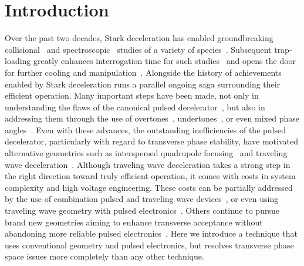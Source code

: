 \documentclass[%
 reprint,
 amsmath,amssymb,
 aps,
prl,
]{revtex4-1}
\begin{document}
\section{Introduction}
Over the past two decades, Stark deceleration has enabled groundbreaking collisional~\cite{Sawyer2011,Kirste2012,Gao2018} and spectroscopic~\cite{Veldhoven2004,Hudson2006,Lev2006,Fast2018} studies of a variety of species~\cite{VanDeMeerakker2012}. 
Subsequent trap-loading greatly enhances interrogation time for such studies~\cite{Sawyer2008} and opens the door for further cooling and manipulation~\cite{Stuhl2012evap, Reens2017}. 
Alongside the history of achievements enabled by Stark deceleration runs a parallel ongoing saga surrounding their efficient operation. 
Many important steps have been made, not only in understanding the flaws of the canonical pulsed decelerator~\cite{VanDeMeerakker2006,Sawyer2008a}, but also in addressing them through the use of overtones~\cite{VanDeMeerakker2005a,Scharfenberg2009}, undertones~\cite{Zhang2016}, or even mixed phase angles~\cite{Parazzoli2009,Hou2013}. 
Even with these advances, the outstanding inefficiencies of the pulsed decelerator, particularly with regard to transverse phase stability, have motivated alternative geometries such as interspersed quadrupole focusing~\cite{Sawyer2008a} and traveling wave deceleration~\cite{Osterwalder2010,VandenBerg2014,Fabrikant2014}. 
Although traveling wave deceleration takes a strong step in the right direction toward truly efficient operation, it comes with costs in system complexity and high voltage engineering. 
These costs can be partially addressed by the use of combination pulsed and traveling wave devices~\cite{Quintero-Perez2013}, or even using traveling wave geometry with pulsed electronics~\cite{Shyur2017}. 
Others continue to pursue brand new geometries aiming to enhance transverse acceptance without abandoning more reliable pulsed electronics~\cite{Wang2016}. 
Here we introduce a technique that uses conventional geometry and pulsed electronics, but resolves transverse phase space issues more completely than any other technique.
\end{document}
